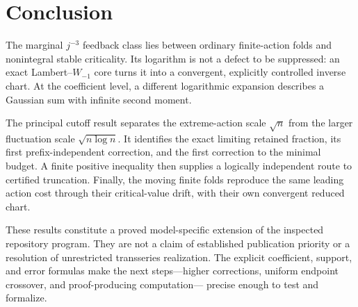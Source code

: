 \documentclass[11pt,a4paper]{article}
\numberwithin{equation}{section}
\theoremstyle{definition}
\theoremstyle{remark}
\begin{document}
\section{Conclusion}
The marginal \(j^{-3}\) feedback class lies between ordinary finite-action
folds and nonintegral stable criticality. Its logarithm is not a defect to
be suppressed: an exact Lambert--\(W_{-1}\) core turns it into a convergent,
explicitly controlled inverse chart. At the coefficient level, a different
logarithmic expansion describes a Gaussian sum with infinite second moment.

The principal cutoff result separates the extreme-action scale \(\sqrt n\)
from the larger fluctuation scale \(\sqrt{n\log n}\). It identifies the exact
limiting retained fraction, its first prefix-independent correction, and
the first correction to the minimal budget. A finite positive inequality
then supplies a logically independent route to certified truncation.
Finally, the moving finite folds reproduce the same leading action cost
through their critical-value drift, with their own convergent reduced chart.

These results constitute a proved model-specific extension of the inspected
repository program. They are not a claim of established publication priority
or a resolution of unrestricted transseries realization. The explicit
coefficient, support, and error formulas make the next steps---higher
corrections, uniform endpoint crossover, and proof-producing computation---
precise enough to test and formalize.
\end{document}

